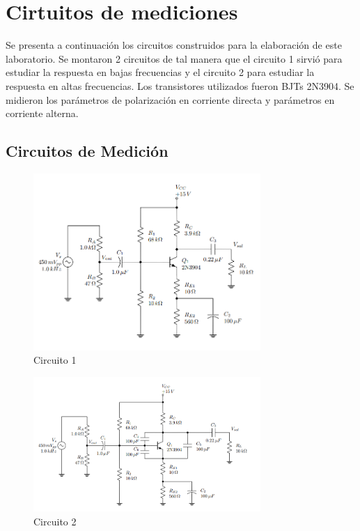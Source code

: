 \documentclass[journal]{IEEEtran}
\begin{document}
\section{Cirtuitos de mediciones}
Se presenta a continuación los circuitos construidos para la elaboración de este laboratorio. Se montaron 2 circuitos de tal manera que el circuito 1 sirvió para estudiar la respuesta en bajas frecuencias y el circuito 2 para estudiar la respuesta en altas frecuencias. Los transistores utilizados fueron BJTs 2N3904.
Se midieron los parámetros de polarización en corriente directa y parámetros en corriente alterna.


\subsection{Circuitos de Medición}

\begin{figure}[H]
        \centering
        \includegraphics[width=3.4in]{Circuito1.png}
        \caption{Circuito 1}
        \label{fig:SignalExperimental_024}
\end{figure}

\begin{figure}[H]
        \centering
        \includegraphics[width=3.4in]{Circuito2.png}
        \caption{Circuito 2}
        \label{fig:SignalExperimental_044}
\end{figure}
\end{document}
